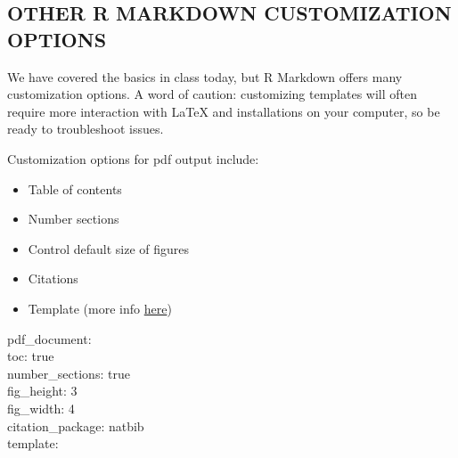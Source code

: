 \documentclass[]{article}
\providecommand{\tightlist}{%
  \setlength{\itemsep}{0pt}\setlength{\parskip}{0pt}}
\begin{document}
\subsection{OTHER R MARKDOWN CUSTOMIZATION
OPTIONS}\label{other-r-markdown-customization-options}

We have covered the basics in class today, but R Markdown offers many
customization options. A word of caution: customizing templates will
often require more interaction with LaTeX and installations on your
computer, so be ready to troubleshoot issues.

Customization options for pdf output include:

\begin{itemize}
\tightlist
\item
  Table of contents
\item
  Number sections
\item
  Control default size of figures
\item
  Citations
\item
  Template (more info
  \href{http://jianghao.wang/post/2017-12-08-rmarkdown-templates/}{here})
\end{itemize}

pdf\_document:\\
toc: true\\
number\_sections: true\\
fig\_height: 3\\
fig\_width: 4\\
citation\_package: natbib\\
template:
\end{document}
